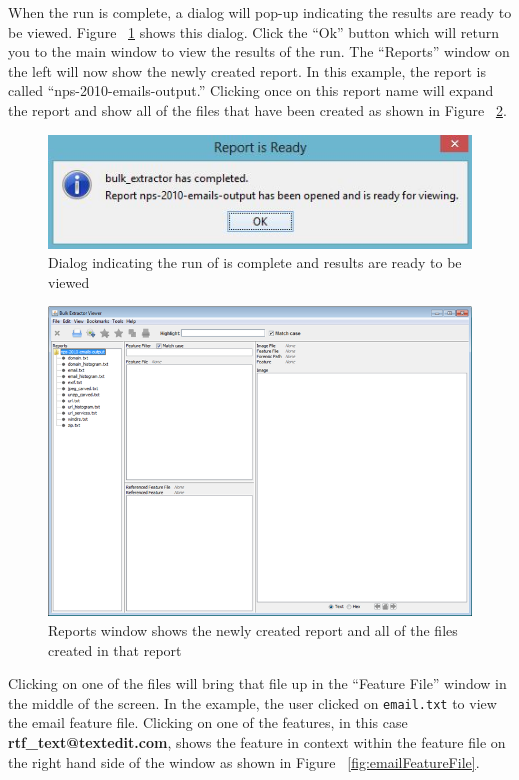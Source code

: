 \documentclass[11pt]{article} %
\begin{document}
When the run is complete, a dialog will pop-up indicating the results are ready to be viewed. Figure ~\ref{fig:reportIsReady} shows this dialog. Click the ``Ok'' button which will return you to the main \viewer window to view the results of the run. The ``Reports'' window on the left will now show the newly created report. In this example, the report is called ``nps-2010-emails-output.'' Clicking once on this report name will expand the report and show all of the files that have been created as shown in Figure ~\ref{fig:listOfOutput}. \\
\begingroup
\center
\begin{figure}
	\includegraphics{viewerPics/reportIsReady.png}
	\caption{Dialog indicating the run of \bulk is complete and results are ready to be viewed}
	\label{fig:reportIsReady}
\end{figure}
\endgroup
\begin{figure}
	\includegraphics[scale=.8]{viewerPics/listOfOutput.png}
	\caption{Reports window shows the newly created report and all of the files created in that report}
	\label{fig:listOfOutput}
\end{figure}
Clicking on one of the files will bring that file up in the ``Feature File'' window in the middle of the screen. In the example, the user clicked on \texttt{email.txt} to view the email feature file. Clicking on one of the features, in this case \textbf{rtf\_text@textedit.com}, shows the feature in context within the feature file on the right hand side of the window as shown in Figure ~\ref{fig:emailFeatureFile}.\\
\end{document}
